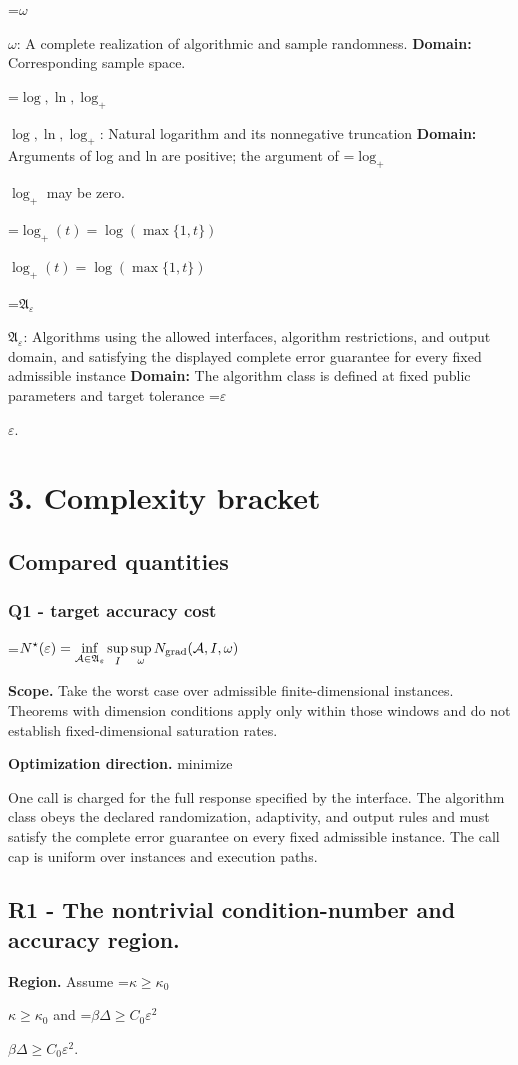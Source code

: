 \documentclass[10pt,a4paper]{article}
\newcommand{\AtlasMath}[1]{\par\begingroup\centering\setbox0=\hbox{$\displaystyle #1$}\ifdim\wd0>1.4\linewidth\typeout{ATLAS WIDE FORMULA: \the\wd0}\fi\ifdim\wd0>\linewidth\resizebox{\linewidth}{!}{\box0}\else\box0\fi\par\endgroup}
\newcommand{\AtlasInlineMath}[1]{\begingroup\setbox0=\hbox{$#1$}\ifdim\wd0>.4\linewidth\endgroup\AtlasMath{#1}\else\endgroup$#1$\fi}
\begin{document}
\AtlasInlineMath{\omega}: A complete realization of algorithmic and sample randomness. \textbf{Domain:} Corresponding sample space.

\AtlasInlineMath{\log,\ln,\log_+}: Natural logarithm and its nonnegative truncation \textbf{Domain:} Arguments of log and ln are positive; the argument of \AtlasInlineMath{\log_+} may be zero.

\AtlasInlineMath{\log_+(t)=\log(\max\{1,t\})}

\AtlasInlineMath{\mathfrak A_\varepsilon}: Algorithms using the allowed interfaces, algorithm restrictions, and output domain, and satisfying the displayed complete error guarantee for every fixed admissible instance \textbf{Domain:} The algorithm class is defined at fixed public parameters and target tolerance \AtlasInlineMath{\varepsilon}.

\section{3. Complexity bracket}
\subsection{Compared quantities}
\subsubsection{Q1 - target accuracy cost}
\AtlasMath{N^\star(\varepsilon)=\inf_{\mathcal A\in\mathfrak A_\varepsilon}\sup_I \sup_\omega N_{\rm grad}(\mathcal A,I,\omega)}
\textbf{Scope.} Take the worst case over admissible finite-dimensional instances. Theorems with dimension conditions apply only within those windows and do not establish fixed-dimensional saturation rates.

\textbf{Optimization direction.} minimize

One call is charged for the full response specified by the interface. The algorithm class obeys the declared randomization, adaptivity, and output rules and must satisfy the complete error guarantee on every fixed admissible instance. The call cap is uniform over instances and execution paths.

\subsection{R1 - The nontrivial condition-number and accuracy region.}
\textbf{Region.} Assume \AtlasInlineMath{\kappa\ge\kappa_0} and \AtlasInlineMath{\beta\Delta\ge C_0\varepsilon^2}.
\end{document}
